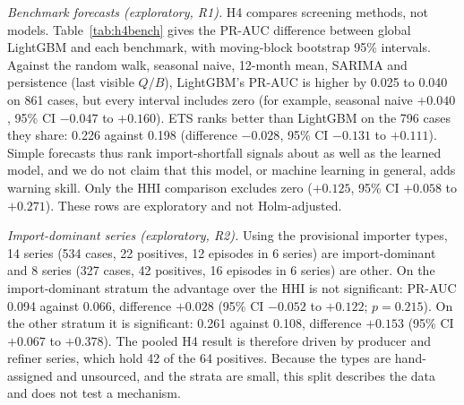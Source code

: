 \documentclass[conference]{IEEEtran}
\begin{document}
\textit{Benchmark forecasts (exploratory, R1).} H4 compares screening methods, not models. Table~\ref{tab:h4bench} gives the PR-AUC difference between global LightGBM and each benchmark, with moving-block bootstrap 95\% intervals. Against the random walk, seasonal naive, 12-month mean, SARIMA and persistence (last visible $Q/B$), LightGBM's PR-AUC is higher by 0.025 to 0.040 on 861 cases, but every interval includes zero (for example, seasonal naive $+0.040$, 95\% CI $-0.047$ to $+0.160$). ETS ranks better than LightGBM on the 796 cases they share: 0.226 against 0.198 (difference $-0.028$, 95\% CI $-0.131$ to $+0.111$). Simple forecasts thus rank import-shortfall signals about as well as the learned model, and we do not claim that this model, or machine learning in general, adds warning skill. Only the HHI comparison excludes zero ($+0.125$, 95\% CI $+0.058$ to $+0.271$). These rows are exploratory and not Holm-adjusted.

\textit{Import-dominant series (exploratory, R2).} Using the provisional importer types, 14 series (534 cases, 22 positives, 12 episodes in 6 series) are import-dominant and 8 series (327 cases, 42 positives, 16 episodes in 6 series) are other. On the import-dominant stratum the advantage over the HHI is not significant: PR-AUC 0.094 against 0.066, difference $+0.028$ (95\% CI $-0.052$ to $+0.122$; $p=0.215$). On the other stratum it is significant: 0.261 against 0.108, difference $+0.153$ (95\% CI $+0.067$ to $+0.378$). The pooled H4 result is therefore driven by producer and refiner series, which hold 42 of the 64 positives. Because the types are hand-assigned and unsourced, and the strata are small, this split describes the data and does not test a mechanism.
\end{document}
